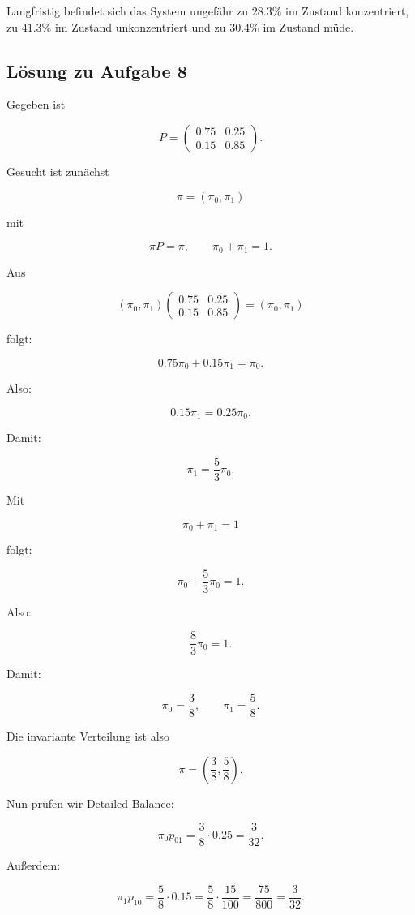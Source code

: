 \documentclass[11pt,a4paper]{article}
\begin{document}
Langfristig befindet sich das System ungefähr zu $28.3\%$ im Zustand konzentriert, zu $41.3\%$ im Zustand unkonzentriert und zu $30.4\%$ im Zustand müde.

\subsection*{Lösung zu Aufgabe 8}

Gegeben ist

\[
P =
\begin{pmatrix}
0.75 & 0.25 \\
0.15 & 0.85
\end{pmatrix}.
\]

Gesucht ist zunächst

\[
\pi=(\pi_0,\pi_1)
\]

mit

\[
\pi P=\pi,
\qquad
\pi_0+\pi_1=1.
\]

Aus

\[
(\pi_0,\pi_1)
\begin{pmatrix}
0.75 & 0.25 \\
0.15 & 0.85
\end{pmatrix}
=
(\pi_0,\pi_1)
\]

folgt:

\[
0.75\pi_0+0.15\pi_1=\pi_0.
\]

Also:

\[
0.15\pi_1=0.25\pi_0.
\]

Damit:

\[
\pi_1=\frac{5}{3}\pi_0.
\]

Mit

\[
\pi_0+\pi_1=1
\]

folgt:

\[
\pi_0+\frac53\pi_0=1.
\]

Also:

\[
\frac83\pi_0=1.
\]

Damit:

\[
\pi_0=\frac38,
\qquad
\pi_1=\frac58.
\]

Die invariante Verteilung ist also

\[
\pi=
\left(
\frac38,\frac58
\right).
\]

Nun prüfen wir Detailed Balance:

\[
\pi_0p_{01}
=
\frac38\cdot 0.25
=
\frac{3}{32}.
\]

Außerdem:

\[
\pi_1p_{10}
=
\frac58\cdot 0.15
=
\frac{5}{8}\cdot \frac{15}{100}
=
\frac{75}{800}
=
\frac{3}{32}.
\]
\end{document}
